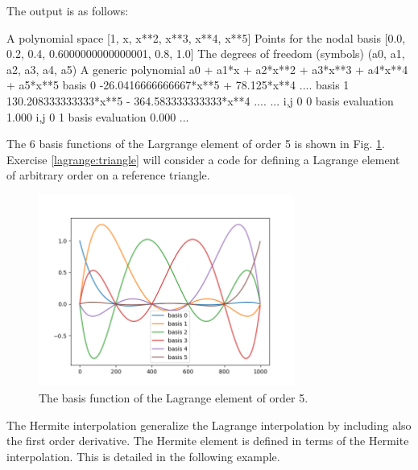 The output is as follows: 
\begin{python}
A polynomial space          [1, x, x**2, x**3, x**4, x**5]
Points for the nodal basis  [0.0, 0.2, 0.4, 0.6000000000000001, 0.8, 1.0]
The degrees of freedom (symbols)  (a0, a1, a2, a3, a4, a5)
A generic polynomial        a0 + a1*x + a2*x**2 + a3*x**3 + a4*x**4 + a5*x**5
basis  0   -26.0416666666667*x**5 + 78.125*x**4 .... 
basis  1   130.208333333333*x**5 - 364.583333333333*x**4 .... 
...
i,j  0 0  basis evaluation  1.000
i,j  0 1  basis evaluation  0.000
...
\end{python}
The 6 basis functions of the Largrange element of order 5 is shown in Fig. \ref{fig:Lagrange5}. 
Exercise \ref{lagrange:triangle} will consider a code for defining a Lagrange element of arbitrary order on a reference triangle.  

\begin{figure}
\begin{center}
\includegraphics[width=0.75\textwidth]{chapters/element/plots/Lagrange5.png}
\caption{
The basis function of the Lagrange element of order 5. }
\label{fig:Lagrange5}
\end{center}
\end{figure}


The Hermite interpolation generalize the Lagrange interpolation by including also the first order derivative. 
The Hermite element is defined in terms of the Hermite interpolation. This is detailed in the following example. 

